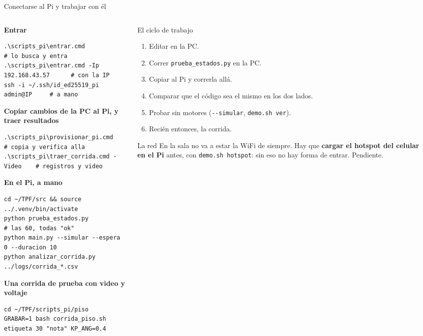 \begin{frame}[fragile]{Conectarse al Pi y trabajar con él}
\begin{columns}[T,onlytextwidth]
\begin{column}{0.56\textwidth}
\scriptsize
\textbf{Entrar}
\begin{verbatim}
.\scripts_pi\entrar.cmd                  # lo busca y entra
.\scripts_pi\entrar.cmd -Ip 192.168.43.57      # con la IP
ssh -i ~/.ssh/id_ed25519_pi admin@IP     # a mano
\end{verbatim}
\textbf{Copiar cambios de la PC al Pi, y traer resultados}
\begin{verbatim}
.\scripts_pi\provisionar_pi.cmd          # copia y verifica alla
.\scripts_pi\traer_corrida.cmd -Video    # registros y video
\end{verbatim}
\textbf{En el Pi, a mano}
\begin{verbatim}
cd ~/TPF/src && source ../.venv/bin/activate
python prueba_estados.py                 # las 60, todas "ok"
python main.py --simular --espera 0 --duracion 10
python analizar_corrida.py ../logs/corrida_*.csv
\end{verbatim}
\textbf{Una corrida de prueba con video y voltaje}
\begin{verbatim}
cd ~/TPF/scripts_pi/piso
GRABAR=1 bash corrida_piso.sh etiqueta 30 "nota" KP_ANG=0.4
\end{verbatim}
\end{column}
\begin{column}{0.42\textwidth}
\footnotesize
\begin{block}{El ciclo de trabajo}
  \begin{enumerate}
    \item Editar en la PC.
    \item Correr \verb|prueba_estados.py| en la PC.
    \item Copiar al Pi y correrla allá.
    \item Comparar que el código sea el mismo en los dos lados.
    \item Probar sin motores (\verb|--simular|, \verb|demo.sh ver|).
    \item Recién entonces, la corrida.
  \end{enumerate}
\end{block}
\begin{alertblock}{La red}
  En la sala no va a estar la WiFi de siempre. Hay que \textbf{cargar el
  hotspot del celular en el Pi} antes, con \verb|demo.sh hotspot|: sin eso no
  hay forma de entrar. Pendiente.
\end{alertblock}
\end{column}
\end{columns}
\end{frame}

